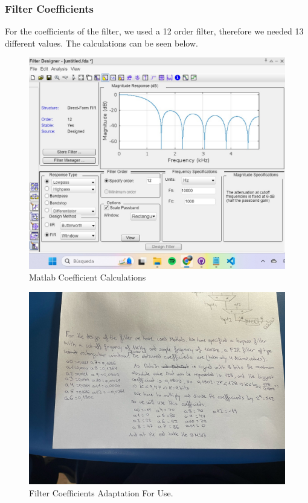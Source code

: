\documentclass[a4paper, 12pt]{article}
\begin{document}
\subsubsection{Filter Coefficients}
\label{sec:org303db76}

For the coefficients of the filter, we used a 12 order filter, therefore we needed 13 different values. The calculations can be seen below.

\begin{figure}[htbp]
\centering
\includegraphics[width=.9\linewidth]{./img/filter_coefficient_matlab.jpg}
\caption{Matlab Coefficient Calculations}
\end{figure}

\begin{figure}[htbp]
\centering
\includegraphics[width=.9\linewidth]{./img/filter_coefficient_calculations.jpg}
\caption{Filter Coefficients Adaptation For Use.}
\end{figure}
\end{document}
